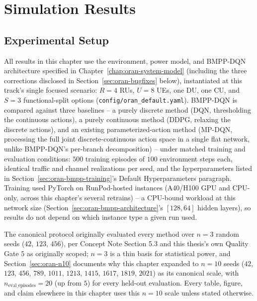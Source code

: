 \chapter{Simulation Results}
\label{chap:oran-results}

\section{Experimental Setup}
\label{sec:oran-experimental-setup}

All results in this chapter use the environment, power model, and BMPP-DQN
architecture specified in Chapter~\ref{chap:oran-system-model} (including
the three corrections disclosed in Section~\ref{sec:oran-bugfixes} below),
instantiated at this track's single focused scenario: $R=4$ RUs, $U=8$
UEs, one DU, one CU, and $S=3$ functional-split options
(\texttt{config/oran\_default.yaml}). BMPP-DQN is compared against three
baselines -- a purely discrete method (DQN, thresholding the continuous
actions), a purely continuous method (DDPG, relaxing the discrete actions),
and an existing parameterized-action method (MP-DQN, processing the full
joint discrete-continuous action space in a single flat network, unlike
BMPP-DQN's per-branch decomposition) -- under matched training and
evaluation conditions: $500$ training episodes of $100$ environment steps
each, identical traffic and channel realizations per seed, and the
hyperparameters listed in Section~\ref{sec:oran-bmpp-training}'s Default
Hyperparameters paragraph. Training used PyTorch on RunPod-hosted
instances (A40/H100 GPU and CPU-only, across this chapter's several
retrains) -- a CPU-bound workload at this network size
(Section~\ref{sec:oran-bmpp-architecture}'s $[128,64]$ hidden layers),
so results do not depend on which instance type a given run used.

The canonical protocol originally evaluated every method over $n=3$
random seeds ($42$, $123$, $456$), per Concept Note Section 5.3 and this
thesis's own Quality Gate 5 as originally scoped; $n=3$ is a thin basis
for statistical power, and Section~\ref{sec:oran-n10} documents why this
chapter expanded to $n=10$ seeds ($42$, $123$, $456$, $789$, $1011$,
$1213$, $1415$, $1617$, $1819$, $2021$) as its canonical scale, with
$n_{\text{eval\_episodes}}=20$ (up from $5$) for every held-out
evaluation. Every table, figure, and claim elsewhere in this chapter uses
this $n=10$ scale unless stated otherwise.

